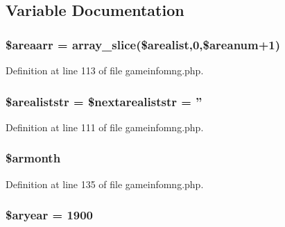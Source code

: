\subsection{Variable Documentation}
\hypertarget{gameinfomng_8php_acc2cd2dba20d325f25b899c214051046}{
\subsubsection[{\$areaarr}]{\setlength{\rightskip}{0pt plus 5cm}\$areaarr = array\+\_\+slice(\$arealist,0,\$areanum+1)}}\label{gameinfomng_8php_acc2cd2dba20d325f25b899c214051046}


Definition at line 113 of file gameinfomng.\+php.

\hypertarget{gameinfomng_8php_af92280f6ec8d2edeac2e7ace4f318b09}{
\subsubsection[{\$arealiststr}]{\setlength{\rightskip}{0pt plus 5cm}\$arealiststr = \$nextarealiststr = ''}}\label{gameinfomng_8php_af92280f6ec8d2edeac2e7ace4f318b09}


Definition at line 111 of file gameinfomng.\+php.

\hypertarget{gameinfomng_8php_a1576525095834b13ef0a2a4ce56f5109}{
\subsubsection[{\$armonth}]{\setlength{\rightskip}{0pt plus 5cm}\$armonth}}\label{gameinfomng_8php_a1576525095834b13ef0a2a4ce56f5109}


Definition at line 135 of file gameinfomng.\+php.

\hypertarget{gameinfomng_8php_a6cb5127bd6798b74e88f6dd74bc5ef67}{
\subsubsection[{\$aryear}]{\setlength{\rightskip}{0pt plus 5cm}\$aryear = 1900}}\label{gameinfomng_8php_a6cb5127bd6798b74e88f6dd74bc5ef67}


